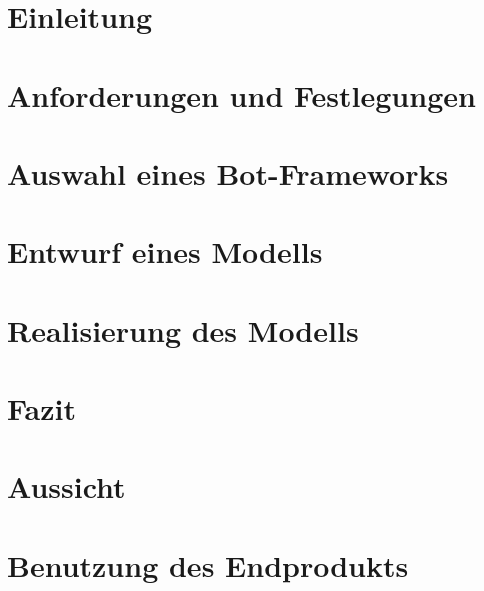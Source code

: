 \section{Einleitung}
\label{einleitung}


\clearpage
\section{Anforderungen und Festlegungen}
\label{anforderungen}


\clearpage
\section{Auswahl eines Bot-Frameworks}
\label{botframework}


\clearpage
\section{Entwurf eines Modells}


\clearpage
\section{Realisierung des Modells}



\clearpage
\section{Fazit}

\clearpage
\section{Aussicht}

\clearpage
\section{Benutzung des Endprodukts}


\nocite{GitHubGettingStartedHubot}
\nocite{BotkitBotkitToolkitbuilding}
\nocite{SlackConversationsAPI}
